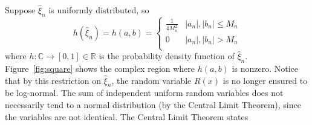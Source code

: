 Suppose $\hat{\xi}_n$ is uniformly distributed, so 
\begin{equation}\label{eq:square}
   h(\hat{\xi}_n) =h(a,b)= \left\{
     \begin{array}{lr}
       \frac{1}{4 M_n^2} & |a_n|,|b_n| \leq M_n\\
       0 & |a_n|,|b_n| > M_n\\
     \end{array}
   \right.
\end{equation} 
where $h:\mathbb{C}\to [0,1]\in \mathbb{R}$ is the probability density
function of $\hat{\xi}_n$. Figure~\ref{fig:square} shows the complex
region where $h(a,b)$ is nonzero. Notice that by this restriction on
$\hat{\xi}_n$, the random variable $R(x)$ is no longer ensured to be log-normal. The
sum of independent uniform random variables does not necessarily tend to a normal
distribution (by the Central Limit Theorem), since the variables are
not identical. The Central Limit Theorem states~\cite{ross}


